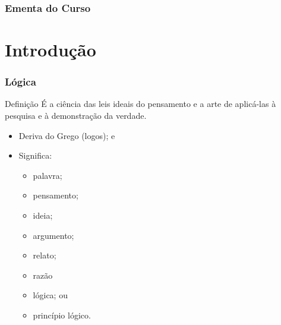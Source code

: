 \documentclass[aspectratio=169]{beamer} %
\begin{document}
\begin{frame}
	\frametitle{Ementa do Curso}
  	\tableofcontents
\end{frame}


\section{Introdução}

\begin{frame}
	\frametitle{Lógica}

	\begin{block}{Definição}
		É a ciência das leis ideais do pensamento e a arte de aplicá-las à pesquisa e à demonstração da verdade.
	\end{block}\vfill
	
	\begin{itemize}
		\item Deriva do Grego (logos); e
		\item Significa:
			\begin{itemize}
			\item palavra;
			\item pensamento;
			\item ideia;
			\item argumento;
			\item relato;
			\item razão
			\item lógica; ou
			\item princípio lógico.
			\end{itemize}
	\end{itemize}
\end{frame}
\end{document}
